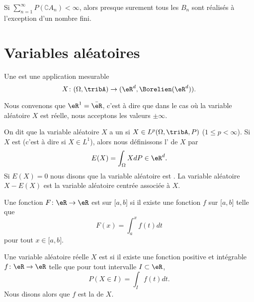 \begin{corollary}
    Si \( \sum_{n=1}^{\infty}P(\complement A_n)<\infty\), alors presque surement tous les \( B_n\) sont réalisés à l'exception d'un nombre fini.
\end{corollary}

\section{Variables aléatoires}

\begin{definition}
    Une  est une application mesurable
    \begin{equation}
        X\colon (\Omega,\tribA)\to (\eR^d,\Borelien(\eR^d)).
    \end{equation}
\end{definition}
Nous convenons que \( \eR^1=\bar\eR\), c'est à dire que dans le cas où la variable aléatoire \( X\) est réelle, nous acceptons les valeurs \( \pm\infty\).

On dit que la variable aléatoire \( X\) a un  si \( X\in L^p(\Omega,\tribA,P)\) (\( 1\leq p<\infty\)). Si \( X\) est  (c'est à dire si \( X\in L^1\)), alors nous définissons l' de \( X\) par
\begin{equation}
    E(X)=\int_{\Omega}XdP\in\eR^d.
\end{equation}
Si \( E(X)=0\) nous disons que la variable aléatoire est . La variable aléatoire \( X-E(X)\) est la variable aléatoire centrée associée à \( X\).

\begin{definition}      \label{DefAbsoluCont}
    Une fonction \( F\colon \eR\to \eR\) est  sur \( \mathopen[ a , b \mathclose]\) si il existe une fonction \( f\) sur \( \mathopen[ a , b \mathclose]\) telle que
    \begin{equation}
        F(x)=\int_a^xf(t)dt
    \end{equation}
    pour tout \( x\in\mathopen[ a , b \mathclose]\).

    Une variable aléatoire réelle \( X\) est  si il existe une fonction positive et intégrable \( f\colon \eR\to \eR\) telle que pour tout intervalle \( I\subset\eR\),
    \begin{equation}
        P(X\in I)=\int_If(t)dt.
    \end{equation}
    Nous disons alors que \( f\) est la  de \( X\).
\end{definition}



